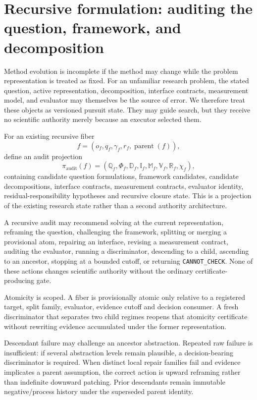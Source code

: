\section{Recursive formulation: auditing the question, framework, and decomposition}
\label{sec:recursive-formulation}

Method evolution is incomplete if the method may change while the problem representation is
treated as fixed. For an unfamiliar research problem, the stated question, active representation,
decomposition, interface contracts, measurement model, and evaluator may themselves be the source
of error. We therefore treat these objects as versioned pursuit state. They may guide search, but
they receive no scientific authority merely because an executor selected them.

For an existing recursive fiber
\[
f=(o_f,q_f,\gamma_f,r_f,\operatorname{parent}(f)),
\]
define an audit projection
\[
\pi_{\mathrm{audit}}(f)=
(\mathbb Q_f,\Phi_f,\mathbb D_f,\mathbb I_f,\mathbb M_f,\mathbb V_f,
 \mathbb R_f,\chi_f),
\]
containing candidate question formulations, framework candidates, candidate decompositions,
interface contracts, measurement contracts, evaluator identity, residual-responsibility hypotheses
and recursive closure state. This is a projection of the existing research state rather than a
second authority architecture.

A recursive audit may recommend solving at the current representation, reframing the question,
challenging the framework, splitting or merging a provisional atom, repairing an interface,
revising a measurement contract, auditing the evaluator, running a discriminator, descending to a
child, ascending to an ancestor, stopping at a bounded cutoff, or returning
\texttt{CANNOT\_CHECK}. None of these actions changes scientific authority without the ordinary
certificate-producing gate.

Atomicity is scoped. A fiber is provisionally atomic only relative to a registered target, split
family, evaluator, evidence cutoff and decision consumer. A fresh discriminator that separates two
child regimes reopens that atomicity certificate without rewriting evidence accumulated under the
former representation.

Descendant failure may challenge an ancestor abstraction. Repeated raw failure is insufficient:
if several abstraction levels remain plausible, a decision-bearing discriminator is required.
When distinct local repair families fail and evidence implicates a parent assumption, the correct
action is upward reframing rather than indefinite downward patching. Prior descendants remain
immutable negative/process history under the superseded parent identity.

